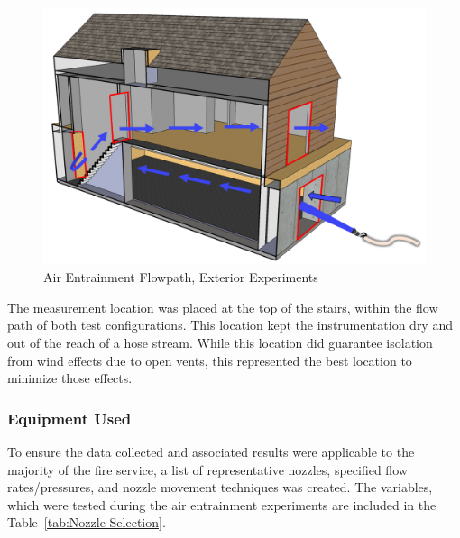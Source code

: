 \documentclass{article}
\begin{document}
\begin{figure}[!ht]
	\centering
	\includegraphics[width=.7\columnwidth]{Figures/Air_Entrainment/Airflow_Layout_Ext}
	\caption{Air Entrainment Flowpath, Exterior Experiments}
	\label{fig:Air_Entrainment_Flowpath_Exterior_Experiments}
\end{figure}

The measurement location was placed at the top of the stairs, within the flow path of both test configurations. This location kept the instrumentation dry and out of the reach of a hose stream. While this location did guarantee isolation from wind effects due to open vents, this represented the best location to minimize those effects.

\subsubsection{Equipment Used}

To ensure the data collected and associated results were applicable to the majority of the fire service, a list of representative nozzles, specified flow rates/pressures, and nozzle movement techniques was created. The variables, which were tested during the air entrainment experiments are included in the Table~\ref{tab:Nozzle Selection}.
\end{document}
